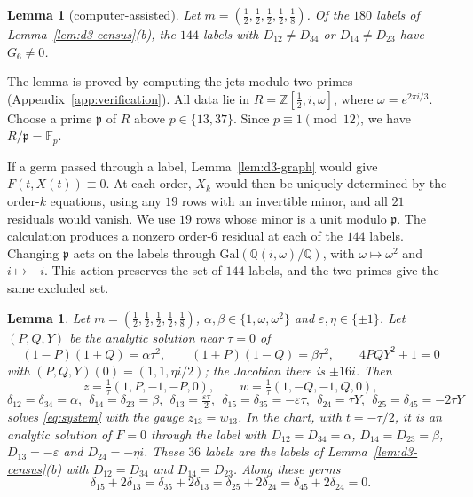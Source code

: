 \documentclass[11pt]{amsart}
\newtheorem{lemma}[theorem]{Lemma}
\theoremstyle{definition}
\theoremstyle{remark}
\begin{document}
\begin{lemma}[computer-assisted]\label{lem:d3-order6}
Let $m=(\frac12,\frac12,\frac12,\frac12,\frac18)$.  Of the $180$ labels of
Lemma~\ref{lem:d3-census}(b), the $144$ labels with $D_{12}\ne D_{34}$ or $D_{14}\ne D_{23}$ have
$G_6\neq0$.
\end{lemma}

{The lemma is proved by computing the jets modulo two primes
(Appendix~\ref{app:verification}). All data lie in $R=\mathbb Z[\frac12,i,\omega]$,
where $\omega=e^{2\pi i/3}$. Choose a prime $\mathfrak p$ of $R$ above $p\in\{13,37\}$.
Since $p\equiv1\pmod{12}$, we have $R/\mathfrak p=\mathbb F_p$.

If a germ passed through a label, Lemma~\ref{lem:d3-graph} would give $F(t,X(t))\equiv0$.
At each order, $X_k$ would then be uniquely determined by the order-$k$ equations,
using any $19$ rows with an invertible minor, and all $21$ residuals would vanish.
We use $19$ rows whose minor is a unit modulo $\mathfrak p$.
The calculation produces a nonzero order-$6$ residual at each of the $144$ labels.
Changing $\mathfrak p$ acts on the labels through $\mathrm{Gal}(\mathbb Q(i,\omega)/\mathbb Q)$,
with $\omega\mapsto\omega^2$ and $i\mapsto-i$. This action preserves the set of $144$ labels,
and the two primes give the same excluded set.}

{\begin{lemma}\label{lem:d3-twisted}
Let $m=(\frac12,\frac12,\frac12,\frac12,\frac18)$, $\alpha,\beta\in\{1,\omega,\omega^2\}$ and
$\varepsilon,\eta\in\{\pm1\}$.  Let $(P,Q,Y)$ be the analytic solution near $\tau=0$ of
\[
(1-P)(1+Q)=\alpha\tau^2,\qquad (1+P)(1-Q)=\beta\tau^2,\qquad 4PQY^2+1=0
\]
with $(P,Q,Y)(0)=(1,1,\eta i/2)$; the Jacobian there is $\pm16i$.  Then
\[
z=\tfrac1\tau(1,P,-1,-P,0),\qquad w=\tfrac1\tau(1,-Q,-1,Q,0),
\]
\[
\delta_{12}=\delta_{34}=\alpha,\ \ \delta_{14}=\delta_{23}=\beta,\ \
\delta_{13}=\tfrac{\varepsilon\tau}2,\ \ \delta_{15}=\delta_{35}=-\varepsilon\tau,\ \
\delta_{24}=\tau Y,\ \ \delta_{25}=\delta_{45}=-2\tau Y
\]
solves \eqref{eq:system} with the gauge $z_{13}=w_{13}$.  In the chart, with $t=-\tau/2$, it is an
analytic solution of $F=0$ through the label with $D_{12}=D_{34}=\alpha$, $D_{14}=D_{23}=\beta$,
$D_{13}=-\varepsilon$ and $D_{24}=-\eta i$.  These $36$ labels are the labels of
Lemma~\ref{lem:d3-census}(b) with $D_{12}=D_{34}$ and $D_{14}=D_{23}$.  Along these germs
\begin{equation}\label{eq:d3-identities}
\delta_{15}+2\delta_{13}=\delta_{35}+2\delta_{13}=\delta_{25}+2\delta_{24}=\delta_{45}+2\delta_{24}=0 .
\end{equation}
\end{lemma}}
\end{document}
